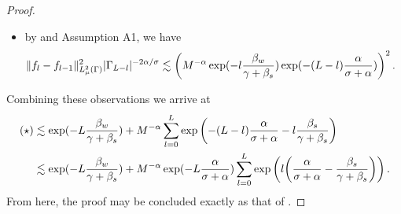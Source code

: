 \begin{proof}
\begin{itemize}
		
		\item by  and Assumption A1, we have 
		\begin{equation*}
		\begin{split}
		\|f_{l}-f_{l-1}\|_{L^2_{\mu}(\Gamma)}^2|\Gamma_{L-l}|^{-2\alpha/\sigma}&\lesssim \left(M^{-\alpha}\exp(-l\frac{\beta_{w}}{\gamma+\beta_{s}})\exp(-(L-l)\frac{\alpha}{\sigma+\alpha})\right)^2.
		\end{split}
		\end{equation*}
	\end{itemize}
	Combining these observations we arrive at 
	\begin{equation*}
	\begin{split}
	(\star)&\lesssim \exp(-L\frac{\beta_{w}}{\gamma+\beta_{s}})+M^{-\alpha}\sum_{l=0}^L\exp\left(-(L-l)\frac{\alpha}{\sigma+\alpha}-l\frac{\beta_{s}}{\gamma+\beta_{s}}\right)\\
	&\lesssim \exp(-L\frac{\beta_{w}}{\gamma+\beta_{s}})+M^{-\alpha}\exp(-L\frac{\alpha}{\sigma+\alpha})\sum_{l=0}^{L}\exp\left(l\bigg(\frac{\alpha}{\sigma+\alpha}-\frac{\beta_{s}}{\gamma+\beta_{s}}\bigg)\right).
	\end{split}
	\end{equation*}
From here, the proof may be concluded exactly as that of .
\end{proof}